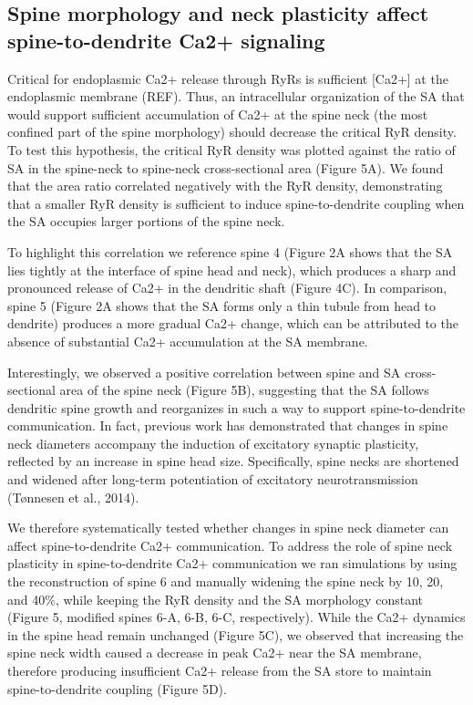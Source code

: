 \documentclass[fleqn,12pt]{wlscirep}
\begin{document}
\subsection*{Spine morphology and neck plasticity affect spine-to-dendrite Ca2+ signaling}Critical for endoplasmic Ca2+ release through RyRs is sufficient [Ca2+] at the endoplasmic membrane (REF). Thus, an intracellular organization of the SA that would support sufficient accumulation of Ca2+ at the spine neck (the most confined part of the spine morphology) should decrease the critical RyR density. To test this hypothesis, the critical RyR density was plotted against the ratio of SA in the spine-neck to spine-neck cross-sectional area (Figure 5A). We found that the area ratio correlated negatively with the RyR density, demonstrating that a smaller RyR density is sufficient to induce spine-to-dendrite coupling when the SA occupies larger portions of the spine neck.

		To highlight this correlation we reference spine 4 (Figure 2A shows that the SA lies tightly at the interface of spine head and neck), which produces a sharp and pronounced release of Ca2+ in the dendritic shaft (Figure 4C). In comparison, spine 5 (Figure 2A shows that the SA forms only a thin tubule from head to dendrite) produces a more gradual Ca2+ change, which can be attributed to the absence of substantial Ca2+ accumulation at the SA membrane.
		
		Interestingly, we observed a positive correlation between spine and SA cross-sectional area of the spine neck (Figure 5B), suggesting that the SA follows dendritic spine growth and reorganizes in such a way to support spine-to-dendrite communication. In fact, previous work has demonstrated that changes in spine neck diameters accompany the induction of excitatory synaptic plasticity, reflected by an increase in spine head size. Specifically, spine necks are shortened and widened after long-term potentiation of excitatory neurotransmission (Tønnesen et al., 2014). 
		
		We therefore systematically tested whether changes in spine neck diameter can affect spine-to-dendrite Ca2+ communication. To address the role of spine neck plasticity in spine-to-dendrite Ca2+ communication we ran simulations by using the reconstruction of spine 6 and manually widening the spine neck by 10, 20, and 40\%, while keeping the RyR density and the SA morphology constant (Figure 5, modified spines 6-A, 6-B, 6-C, respectively). While the Ca2+ dynamics in the spine head remain unchanged (Figure 5C), we observed that increasing the spine neck width caused a decrease in peak Ca2+ near the SA membrane, therefore producing insufficient Ca2+ release from the SA store to maintain spine-to-dendrite coupling (Figure 5D). 
		
\end{document}
